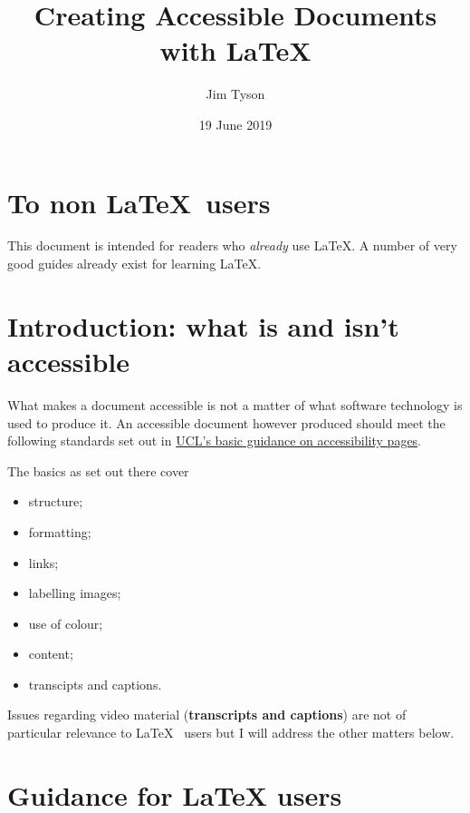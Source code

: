 \documentclass[]{article}
\title{Creating Accessible Documents with LaTeX}
\author{Jim Tyson}
\date{19 June 2019}
\providecommand{\tightlist}{%
  \setlength{\itemsep}{0pt}\setlength{\parskip}{0pt}}
\begin{document}
\onehalfspacing

\maketitle

{
\setcounter{tocdepth}{2}
\tableofcontents
}
\hypertarget{to-non-users}{%
\section{\texorpdfstring{To non
\LaTeX~users}{To non ~users}}\label{to-non-users}}

This document is intended for readers who \emph{already} use \LaTeX. A
number of very good guides already exist for learning \LaTeX.

\hypertarget{introduction-what-is-and-isnt-accessible}{%
\section{Introduction: what is and isn't
accessible}\label{introduction-what-is-and-isnt-accessible}}

What makes a document accessible is not a matter of what software
technology is used to produce it. An accessible document however
produced should meet the following standards set out in
\href{https://www.ucl.ac.uk/isd/services/websites-apps/creating-accessible-content/accessibility-fundamentals}{UCL's
basic guidance on accessibility pages}.

The basics as set out there cover

\begin{itemize}
\tightlist
\item
  structure;
\item
  formatting;
\item
  links;
\item
  labelling images;
\item
  use of colour;
\item
  content;%
\item
  transcipts and captions.
\end{itemize}

Issues regarding video material (\textbf{transcripts and captions}) are
not of particular relevance to \LaTeX~ users but I will address the
other matters below.

\hypertarget{guidance-for-latex-users}{%
\section{Guidance for LaTeX users}\label{guidance-for-latex-users}}
\end{document}

